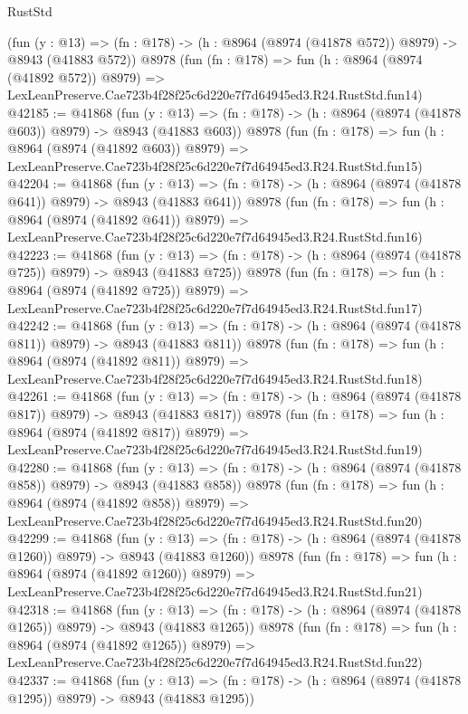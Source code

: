\begin{lexlean}{RustStd}
\begin{coremodule}
    (fun (y : @13) => (fn : @178) -> (h : @8964 (@8974 (@41878 @572)) @8979) -> @8943 (@41883 @572))
    @8978
    (fun (fn : @178) =>
    fun (h : @8964 (@8974 (@41892 @572)) @8979) =>
    LexLeanPreserve.Cae723b4f28f25c6d220e7f7d64945ed3.R24.RustStd.fun14)
@42185 := @41868
    (fun (y : @13) => (fn : @178) -> (h : @8964 (@8974 (@41878 @603)) @8979) -> @8943 (@41883 @603))
    @8978
    (fun (fn : @178) =>
    fun (h : @8964 (@8974 (@41892 @603)) @8979) =>
    LexLeanPreserve.Cae723b4f28f25c6d220e7f7d64945ed3.R24.RustStd.fun15)
@42204 := @41868
    (fun (y : @13) => (fn : @178) -> (h : @8964 (@8974 (@41878 @641)) @8979) -> @8943 (@41883 @641))
    @8978
    (fun (fn : @178) =>
    fun (h : @8964 (@8974 (@41892 @641)) @8979) =>
    LexLeanPreserve.Cae723b4f28f25c6d220e7f7d64945ed3.R24.RustStd.fun16)
@42223 := @41868
    (fun (y : @13) => (fn : @178) -> (h : @8964 (@8974 (@41878 @725)) @8979) -> @8943 (@41883 @725))
    @8978
    (fun (fn : @178) =>
    fun (h : @8964 (@8974 (@41892 @725)) @8979) =>
    LexLeanPreserve.Cae723b4f28f25c6d220e7f7d64945ed3.R24.RustStd.fun17)
@42242 := @41868
    (fun (y : @13) => (fn : @178) -> (h : @8964 (@8974 (@41878 @811)) @8979) -> @8943 (@41883 @811))
    @8978
    (fun (fn : @178) =>
    fun (h : @8964 (@8974 (@41892 @811)) @8979) =>
    LexLeanPreserve.Cae723b4f28f25c6d220e7f7d64945ed3.R24.RustStd.fun18)
@42261 := @41868
    (fun (y : @13) => (fn : @178) -> (h : @8964 (@8974 (@41878 @817)) @8979) -> @8943 (@41883 @817))
    @8978
    (fun (fn : @178) =>
    fun (h : @8964 (@8974 (@41892 @817)) @8979) =>
    LexLeanPreserve.Cae723b4f28f25c6d220e7f7d64945ed3.R24.RustStd.fun19)
@42280 := @41868
    (fun (y : @13) => (fn : @178) -> (h : @8964 (@8974 (@41878 @858)) @8979) -> @8943 (@41883 @858))
    @8978
    (fun (fn : @178) =>
    fun (h : @8964 (@8974 (@41892 @858)) @8979) =>
    LexLeanPreserve.Cae723b4f28f25c6d220e7f7d64945ed3.R24.RustStd.fun20)
@42299 := @41868
    (fun (y : @13) =>
    (fn : @178) -> (h : @8964 (@8974 (@41878 @1260)) @8979) -> @8943 (@41883 @1260))
    @8978
    (fun (fn : @178) =>
    fun (h : @8964 (@8974 (@41892 @1260)) @8979) =>
    LexLeanPreserve.Cae723b4f28f25c6d220e7f7d64945ed3.R24.RustStd.fun21)
@42318 := @41868
    (fun (y : @13) =>
    (fn : @178) -> (h : @8964 (@8974 (@41878 @1265)) @8979) -> @8943 (@41883 @1265))
    @8978
    (fun (fn : @178) =>
    fun (h : @8964 (@8974 (@41892 @1265)) @8979) =>
    LexLeanPreserve.Cae723b4f28f25c6d220e7f7d64945ed3.R24.RustStd.fun22)
@42337 := @41868
    (fun (y : @13) =>
    (fn : @178) -> (h : @8964 (@8974 (@41878 @1295)) @8979) -> @8943 (@41883 @1295))

\end{coremodule}
\end{lexlean}
